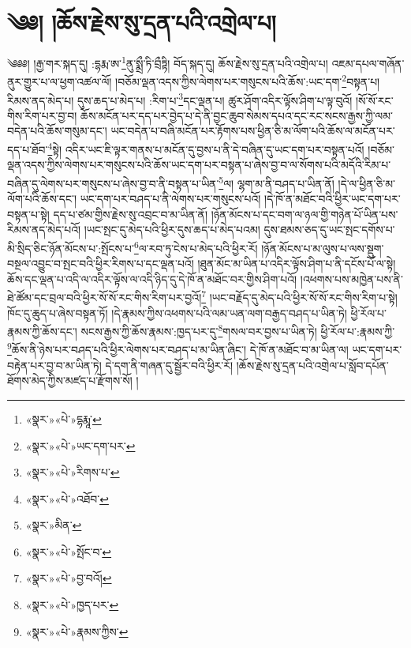 \chapter{༄༅། །ཆོས་རྗེས་སུ་དྲན་པའི་འགྲེལ་པ།}༄༅༅། །རྒྱ་གར་སྐད་དུ། :དྷརྨ་ཨ་\footnote{«སྣར་»«པེ་»དྷརྨཱ་}ནུ་སྨྲྀ་ཏི་བྲྀཏྟི། བོད་སྐད་དུ། ཆོས་རྗེས་སུ་དྲན་པའི་འགྲེལ་པ། འཇམ་དཔལ་གཞོན་ནུར་གྱུར་པ་ལ་ཕྱག་འཚལ་ལོ། །བཅོམ་ལྡན་འདས་ཀྱིས་ལེགས་པར་གསུངས་པའི་ཆོས་:ཡང་དག་\footnote{«སྣར་»«པེ་»ཡང་དག་པར་}བསྟན་པ། རིམས་ནད་མེད་པ། དུས་ཆད་པ་མེད་པ། :རིག་པ་\footnote{«སྣར་»«པེ་»རིགས་པ་}དང་ལྡན་པ། ཚུར་ཤོག་འདིར་ལྟོས་ཤིག་པ་ལྟ་བུའོ། །སོ་སོ་རང་གིས་རིག་པར་བྱ་བ། ཆོས་མངོན་པར་དད་པར་བྱེད་པ་དེ་ནི་བྱང་ཆུབ་སེམས་དཔའ་དང་རང་སངས་རྒྱས་ཀྱི་ལམ་བདེན་པའི་ཆོས་གསུམ་དང་། ཡང་བདེན་པ་བཞི་མངོན་པར་རྟོགས་པས་ཕྱིན་ཅི་མ་ལོག་པའི་ཆོས་ལ་མངོན་པར་དད་པ་ཐོབ་\footnote{«སྣར་»«པེ་»འཐོབ་}སྟེ། འདིར་ཡང་ཇི་ལྟར་གནས་པ་མངོན་དུ་བྱས་པ་ནི་དེ་བཞིན་དུ་ཡང་དག་པར་བསྟན་པའོ། །བཅོམ་ལྡན་འདས་ཀྱིས་ལེགས་པར་གསུངས་པའི་ཆོས་ཡང་དག་པར་བསྟན་པ་ཞེས་བྱ་བ་ལ་སོགས་པའི་མདོའི་རིམ་པ་བཞིན་དུ་ལེགས་པར་གསུངས་པ་ཞེས་བྱ་བ་ནི་བསྟན་པ་ཡིན་\footnote{«སྣར་»མིན་}ལ། ལྷག་མ་ནི་བཤད་པ་ཡིན་ནོ། །དེ་ལ་ཕྱིན་ཅི་མ་ལོག་པའི་ཆོས་དང་། ཡང་དག་པར་བཤད་པ་ནི་ལེགས་པར་གསུངས་པའོ། །དེ་ཁོ་ན་མཐོང་བའི་ཕྱིར་ཡང་དག་པར་བསྟན་པ་སྟེ། དད་པ་ཙམ་གྱིས་རྗེས་སུ་འབྲང་བ་མ་ཡིན་ནོ། །ཉོན་མོངས་པ་དང་བག་ལ་ཉལ་གྱི་གཉེན་པོ་ཡིན་པས་རིམས་ནད་མེད་པའོ། །ཡང་སྤང་དུ་མེད་པའི་ཕྱིར་དུས་ཆད་པ་མེད་པའམ། དུས་ཐམས་ཅད་དུ་ཡང་སྤང་དགོས་པ་མི་སྲིད་ཅིང་ཉོན་མོངས་པ་:སྤོངས་པ་\footnote{«སྣར་»«པེ་»སྤོང་བ་}ལ་རབ་ཏུ་ངེས་པ་མེད་པའི་ཕྱིར་རོ། །ཉོན་མོངས་པ་མ་ལུས་པ་ལས་སྡུག་བསྔལ་འབྱུང་བ་སྤང་བའི་ཕྱིར་རིགས་པ་དང་ལྡན་པའོ། །ཐུན་མོང་མ་ཡིན་པ་འདིར་ལྟོས་ཤིག་པ་ནི་དངོས་པོ་ལ་སྟེ། ཆོས་དང་ལྡན་པ་འདི་ལ་འདིར་ལྟོས་ལ་འདི་ཉིད་དུ་དེ་ཁོ་ན་མཐོང་བར་གྱིས་ཤིག་པའོ། །འཕགས་པས་མཁྱེན་པས་ནི་ཐེ་ཚོམ་དང་བྲལ་བའི་ཕྱིར་སོ་སོ་རང་གིས་རིག་པར་བྱའོ།\footnote{«སྣར་»«པེ་»བྱ་བའོ།} །ཡང་བརྗོད་དུ་མེད་པའི་ཕྱིར་སོ་སོ་རང་གིས་རིག་པ་སྟེ། ཁོང་དུ་ཆུད་པ་ཞེས་བསྟན་ཏོ། །དེ་རྣམས་ཀྱིས་འཕགས་པའི་ལམ་ཡན་ལག་བརྒྱད་བཤད་པ་ཡིན་ཏེ། ཕྱི་རོལ་པ་རྣམས་ཀྱི་ཆོས་དང་། སངས་རྒྱས་ཀྱི་ཆོས་རྣམས་:ཁྱད་པར་དུ་\footnote{«སྣར་»«པེ་»ཁྱད་པར་}གསལ་བར་བྱས་པ་ཡིན་ཏེ། ཕྱི་རོལ་པ་:རྣམས་ཀྱི་\footnote{«སྣར་»«པེ་»རྣམས་ཀྱིས་}ཆོས་ནི་ཉེས་པར་བཤད་པའི་ཕྱིར་ལེགས་པར་བཤད་པ་མ་ཡིན་ཞིང་། དེ་ཁོ་ན་མཐོང་བ་མ་ཡིན་ལ། ཡང་དག་པར་བརྟེན་པར་བྱ་བ་མ་ཡིན་ཏེ། དེ་དག་ནི་གཞན་དུ་སྦྱོར་བའི་ཕྱིར་རོ། །ཆོས་རྗེས་སུ་དྲན་པའི་འགྲེལ་པ་སློབ་དཔོན་ཐོགས་མེད་ཀྱིས་མཛད་པ་རྫོགས་སོ། ། 